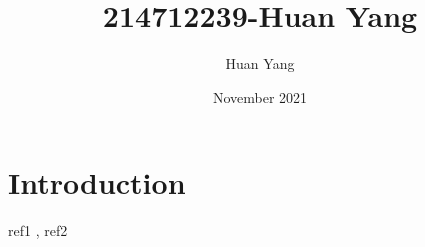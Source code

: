 \documentclass{article}
\title{214712239-Huan Yang}
\author{Huan Yang}
\date{November 2021}
\begin{document}
\maketitle

\section{Introduction}
ref1 \cite{Wille1982},
ref2 \cite{DBLP:journals/corr/HeZRS15}


\end{document}
